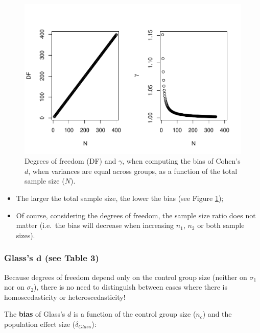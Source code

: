 \documentclass[
  english,
  man,mask]{apa6}
\begin{document}
\begin{figure}
\centering
\includegraphics{SupMat1_files/figure-latex/biascohendNsize2-1.pdf}
\caption{\label{fig:biascohendNsize2}Degrees of freedom (DF) and \(\gamma\), when computing the bias of Cohen's \(d\), when variances are equal across groups, as a function of the total sample size (\(N\)).}
\end{figure}

\begin{itemize}
\item
  The larger the total sample size, the lower the bias (see Figure \ref{fig:biascohendNsize2});
\item
  Of course, considering the degrees of freedom, the sample size ratio does not matter (i.e.~the bias will decrease when increasing \(n_1\), \(n_2\) or both sample sizes).
\end{itemize}

\hypertarget{glasss-bmd-see-table-3}{%
\subsubsection{\texorpdfstring{Glass's \(\bm{d}\) (see Table 3)}{Glass's \textbackslash bm\{d\} (see Table 3)}}\label{glasss-bmd-see-table-3}}

Because degrees of freedom depend only on the control group size (neither on \(\sigma_1\) nor on \(\sigma_2\)), there is no need to distinguish between cases where there is homoscedasticity or heteroscedasticity!

The \textbf{bias} of Glass's \(d\) is a function of the control group size (\(n_c\)) and the population effect size (\(\delta_{Glass}\)):
\end{document}
